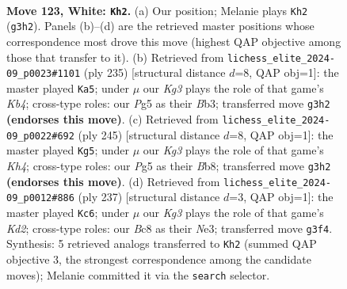 \documentclass[11pt]{article}
\begin{document}
\clearpage

\begin{figure}[p]\centering
\begin{subfigure}{0.46\textwidth}\centering
\resizebox{\linewidth}{!}{%
\newchessgame
\chessboard[
  setfen={2B5/6k1/8/6PP/8/6K1/2n5/8 w - - 15 123},
  showmover=false,
  pgfstyle=straightmove, color=movearrow, markmove={g3-h2}
]}
\caption{}
\end{subfigure}\hfill
\begin{subfigure}{0.46\textwidth}\centering
\resizebox{\linewidth}{!}{%
\newchessgame
\chessboard[
  setfen={8/8/8/1k6/8/pb6/8/1K6 b - - 85 118},
  showmover=false,
  pgfstyle=straightmove, color=movearrow, markmove={b5-a5}
]}
\caption{}
\end{subfigure}
\\[4pt]
\begin{subfigure}{0.46\textwidth}\centering
\resizebox{\linewidth}{!}{%
\newchessgame
\chessboard[
  setfen={1b6/8/8/7k/8/7p/8/7K b - - 17 123},
  showmover=false,
  pgfstyle=straightmove, color=movearrow, markmove={h5-g5}
]}
\caption{}
\end{subfigure}\hfill
\begin{subfigure}{0.46\textwidth}\centering
\resizebox{\linewidth}{!}{%
\newchessgame
\chessboard[
  setfen={8/3k4/6N1/2p5/p7/2K1n3/8/8 b - - 15 119},
  showmover=false,
  pgfstyle=straightmove, color=movearrow, markmove={d7-c6}
]}
\caption{}
\end{subfigure}
\caption{\textbf{Move 123, White: \texttt{Kh2}.} (a) Our position; Melanie plays \texttt{Kh2} (\texttt{g3h2}). Panels (b)--(d) are the retrieved master positions whose correspondence most drove this move (highest QAP objective among those that transfer to it). (b) Retrieved from \texttt{lichess\_elite\_2024-09\_p0023\#1101} (ply 235) [structural distance $d$=8, QAP obj=1]: the master played \texttt{Ka5}; under $\mu$ our \emph{Kg3} plays the role of that game's \emph{Kb4}; cross-type roles: our \emph{P}g5 as their \emph{B}b3; transferred move \texttt{g3h2} \textbf{(endorses this move)}. (c) Retrieved from \texttt{lichess\_elite\_2024-09\_p0022\#692} (ply 245) [structural distance $d$=8, QAP obj=1]: the master played \texttt{Kg5}; under $\mu$ our \emph{Kg3} plays the role of that game's \emph{Kh4}; cross-type roles: our \emph{P}g5 as their \emph{B}b8; transferred move \texttt{g3h2} \textbf{(endorses this move)}. (d) Retrieved from \texttt{lichess\_elite\_2024-09\_p0012\#886} (ply 237) [structural distance $d$=3, QAP obj=1]: the master played \texttt{Kc6}; under $\mu$ our \emph{Kg3} plays the role of that game's \emph{Kd2}; cross-type roles: our \emph{B}c8 as their \emph{N}e3; transferred move \texttt{g3f4}. Synthesis: 5 retrieved analogs transferred to \texttt{Kh2} (summed QAP objective 3, the strongest correspondence among the candidate moves); Melanie committed it via the \texttt{search} selector.}
\label{fig:thought-m244}
\end{figure}
\end{document}
